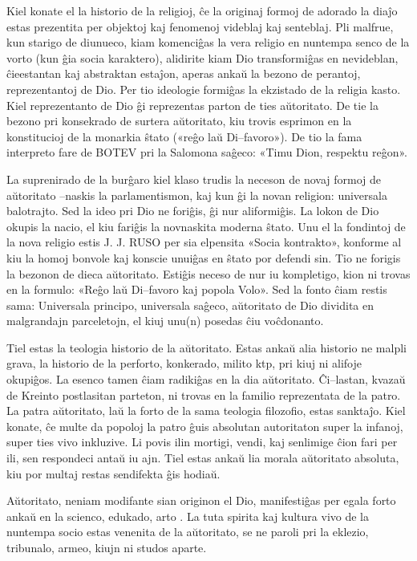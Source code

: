 Kiel konate el la historio de la religioj, ĉe la originaj formoj de adorado la diaĵo estas prezentita per objektoj kaj fenomenoj videblaj kaj senteblaj. Pli malfrue, kun starigo de diunueco, kiam komenciĝas la vera religio en nuntempa senco de la vorto (kun ĝia socia karaktero), alidirite kiam Dio transformiĝas en nevideblan, ĉieestantan kaj abstraktan estaĵon, aperas ankaŭ la bezono de perantoj, reprezentantoj de Dio. Per tio ideologie formiĝas la ekzistado de la religia kasto. Kiel reprezentanto de Dio ĝi reprezentas parton de ties aŭtoritato. De tie la bezono pri konsekrado de surtera aŭtoritato, kiu trovis esprimon en la konstitucioj de la monarkia ŝtato («reĝo laŭ Di–favoro»). De tio la fama interpreto fare de BOTEV pri la Salomona saĝeco: «Timu Dion, respektu reĝon».

La suprenirado de la burĝaro kiel klaso trudis la neceson de novaj formoj de aŭtoritato –naskis la parlamentismon, kaj kun ĝi la novan religion: universala balotrajto. Sed la ideo pri Dio ne foriĝis, ĝi nur aliformiĝis. La lokon de Dio okupis la nacio, el kiu fariĝis la novnaskita moderna ŝtato. Unu el la fondintoj de la nova religio estis J. J. RUSO per sia elpensita «Socia kontrakto», konforme al kiu la homoj bonvole kaj konscie unuiĝas en ŝtato por defendi sin. Tio ne forigis la bezonon de dieca aŭtoritato. Estiĝis neceso de nur iu kompletigo, kion ni trovas en la formulo: «Reĝo laŭ Di–favoro kaj popola Volo». Sed la fonto ĉiam restis sama: Universala principo, universala saĝeco, aŭtoritato de Dio dividita en malgrandajn parceletojn, el kiuj unu(n) posedas ĉiu voĉdonanto.

Tiel estas la teologia historio de la aŭtoritato. Estas ankaŭ alia historio ne malpli grava, la historio de la perforto, konkerado, milito ktp, pri kiuj ni alifoje okupiĝos. La esenco tamen ĉiam radikiĝas en la dia aŭtoritato. Ĉi–lastan, kvazaŭ de Kreinto postlasitan parteton, ni trovas en la familio reprezentata de la patro. La patra aŭtoritato, laŭ la forto de la sama teologia filozofio, estas sanktaĵo. Kiel konate, ĉe multe da popoloj la patro ĝuis absolutan autoritaton super la infanoj, super ties vivo inkluzive. Li povis ilin mortigi, vendi, kaj senlimige ĉion fari per ili, sen respondeci antaŭ iu ajn. Tiel estas ankaŭ lia morala aŭtoritato absoluta, kiu por multaj restas sendifekta ĝis hodiaŭ.

Aŭtoritato, neniam modifante sian originon el Dio, manifestiĝas per egala forto ankaŭ en la scienco, edukado, arto . La tuta spirita kaj kultura vivo de la nuntempa socio estas venenita de la aŭtoritato, se ne paroli pri la eklezio, tribunalo, armeo, kiujn ni studos aparte.

